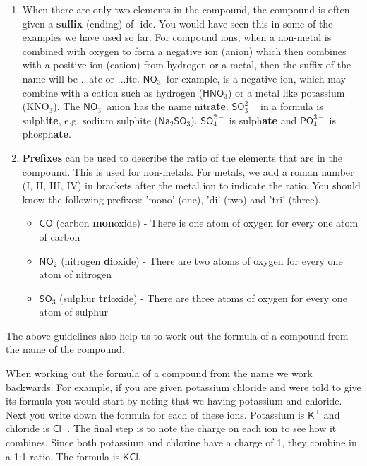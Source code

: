 \begin{enumerate}[noitemsep, label=\textbf{\arabic*}. ]
\begin{table}[H]
\begin{center}
 \end{center}
\caption{Table of anions}
\label{tab:anions}
\end{table}

    \par
  \label{m38708*uid42}\item When there are only two elements in the compound, the compound is often given a \textbf{suffix} (ending) of -ide. You would have seen this in some of the examples we have used so far. For compound ions, when a non-metal is combined with oxygen to form a negative ion (anion) which then combines with a positive ion (cation) from hydrogen or a metal, then the suffix of the name will be ...ate or ...ite. $\mathsf{NO}_{3}^{-}$ for example, is a negative ion, which may combine with a cation such as hydrogen ($\mathsf{HNO}{}_{3}$) or a metal like potassium (KNO$_\text{3}$). The $\mathsf{NO}_{3}^{-}$ anion has the name nitr\textbf{ate}. $\mathsf{SO}_{3}^{2-}$ in a formula is sulph\textbf{ite}, e.g. sodium sulphite ($\mathsf{Na}{}_{2}\mathsf{SO}{}_{3}$).\newline
     $\mathsf{SO}_{4}^{2-}$ is sulph\textbf{ate} and $\mathsf{PO}_{4}^{3-}$ is phosph\textbf{ate}.
\label{m38708*uid43}\item \textbf{Prefixes} can be used to describe the ratio of the elements that are in the compound. This is used for non-metals. For metals, we add a roman number (I, II, III, IV) in brackets after the metal ion to indicate the ratio. You should know the following prefixes: 'mono' (one), 'di' (two) and 'tri' (three).
\label{m38708*id64977}\begin{itemize}[noitemsep]
            \label{m38708*uid44}\item $\mathsf{CO}$ (carbon \textbf{mon}oxide) - There is one atom of oxygen for every one atom of carbon
\label{m38708*uid45}\item $\mathsf{NO}{}_{2}$ (nitrogen \textbf{di}oxide) - There are two atoms of oxygen for every one atom of nitrogen
\label{m38708*uid46}\item $\mathsf{SO}{}_{3}$ (sulphur \textbf{tri}oxide) - There are three atoms of oxygen for every one atom of sulphur
\end{itemize}
        \end{enumerate}
\label{m38708*id537402}The above guidelines also help us to work out the formula of a compound from the name of the compound.\par 
\label{m38708*eip-178}When working out the formula of a compound from the name we work backwards. For example, if you are given potassium chloride and were told to give its formula you would start by noting that we having potassium and chloride. Next you write down the formula for each of these ions. Potassium is ${\mathsf{K}}^{+}$ and chloride is ${\mathsf{Cl}}^{-}$. The final step is to note the charge on each ion to see how it combines. Since both potassium and chlorine have a charge of 1, they combine in a 1:1 ratio. The formula is $\mathsf{KCl}$.\par \label{m38708*notfhsst!!!underscore!!!id252}
